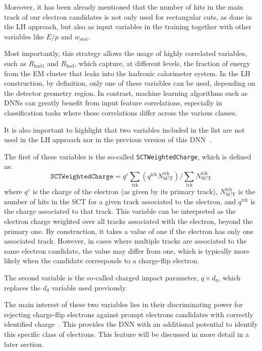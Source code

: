 Moreover, it has been already mentioned that the number of hits in the main track of our electron candidates is not only used for rectangular cuts, as done in the LH approach, but also as input variables in the training together with other variables like $E/p$ and $w_{\text{stot}}$. 

Most importantly, this strategy allows the usage of highly correlated variables, such as $R_{\text{had1}}$ and $R_{\text{had}}$, which capture, at different levels, the fraction of energy from the EM cluster that leaks into the hadronic calorimeter system. In the LH construction, by definition, only one of these variables can be used, depending on the detector geometry region. In contrast, machine learning algorithms such as DNNs can greatly benefit from input feature correlations, especially in classification tasks where these correlations differ across the various classes.

It is also important to highlight that two variables included in the list are not used in the LH approach nor in the previous version of this DNN~\cite{dnn_paper}. 

The first of these variables is the so-called \texttt{SCTWeightedCharge}, which is defined as:
\begin{equation}
  \texttt{SCTWeightedCharge} = q^{e}\sum_{\text{trk}}\left( q^{\text{trk}}N^{\text{trk}}_{\text{SCT}} \right)/\sum_{\text{trk}} N^{\text{trk}}_{\text{SCT}}
\end{equation}
where $q^{e}$ is the charge of the electron (as given by its primary track), $N^{\text{trk}}_{\text{SCT}}$ is the number of hits in the SCT for a given track associated to the electron, and $q^{\text{trk}}$ is the charge associated to that track. This variable can be interpreted as the electron charge weighted over all tracks associated with the electron, beyond the primary one. By construction, it takes a value of one if the electron has only one associated track. However, in cases where multiple tracks are associated to the same electron candidate, the value may differ from one, which is typically more likely when the candidate corresponds to a charge-flip electron.

The second variable is the so-called charged impact parameter, $q \times d_{0}$, which replaces the $d_{0}$ variable used previously.

The main interest of these two variables lies in their discriminating power for rejecting charge-flip electrons against prompt electrons candidates with correctly identified charge~\cite{carnelli}. This provides the DNN with an additional potential to identify this specific class of electrons. This feature will be discussed in more detail in a later section.

